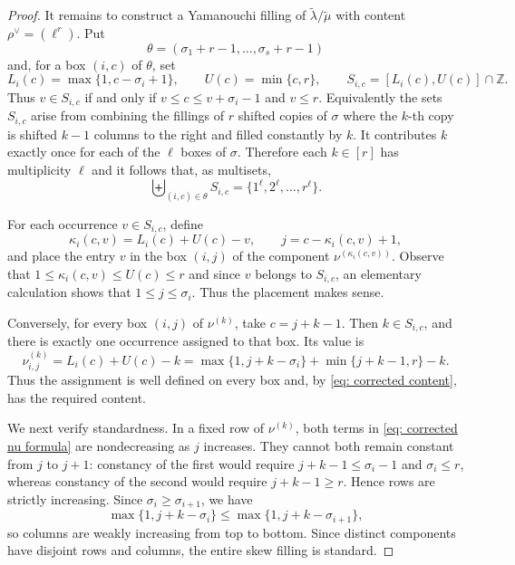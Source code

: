 \documentclass[11pt, reqno]{amsart}
\numberwithin{equation}{section}
\theoremstyle{definition}
\newcommand{\s}{\sigma}
\begin{document}
\begin{appendix}
\begin{proof}
It remains to construct a Yamanouchi filling of
$\widetilde\lambda/\widetilde\mu$ with content
$\rho^\vee=(\ell^r)$.  Put
\[
\theta=(\sigma_1+r-1,\ldots,\sigma_s+r-1)
\]
and, for a box $(i,c)$ of $\theta$, set
\begin{equation}\label{eq: corrected S sets}
L_i(c)=\max\{1,c-\sigma_i+1\},\qquad
U(c)=\min\{c,r\},\qquad
S_{i,c}=[L_i(c),U(c)]\cap\mathbb Z.
\end{equation}
Thus $v\in S_{i,c}$ if and only if
$v\leq c\leq v+\sigma_i-1$ and $v\leq r$. Equivalently the sets $S_{i,c}$ arise from combining the fillings  of $r$ shifted copies of $\s$ where the $k$-th copy is shifted $k-1$ columns to the right and filled constantly by $k$. It contributes $k$ exactly once for each of the $\ell$ boxes of $\s$. Therefore each $k\in[r]$ has multiplicity $\ell$ and it follows that, as multisets,
\begin{equation}\label{eq: corrected content}
\mathop{\biguplus}_{(i,c)\in\theta}S_{i,c}
=\{1^\ell,2^\ell,\ldots,r^\ell\}.
\end{equation}

For each occurrence $v\in S_{i,c}$, define
\begin{equation}\label{eq: corrected stage assignment}
\kappa_i(c,v)=L_i(c)+U(c)-v,
\qquad j=c-\kappa_i(c,v)+1,
\end{equation}
and place the entry $v$ in the box $(i,j)$ of the component
$\nu^{(\kappa_i(c,v))}$.  Observe that  $1\leq \kappa_i(c,v)\leq U(c)\leq r$ and since $v$ belongs to
$S_{i,c}$, an elementary calculation shows that $1\leq j\leq\sigma_i$. Thus the placement makes sense.

 Conversely, for every box
$(i,j)$ of $\nu^{(k)}$, take $c=j+k-1$.  Then $k\in S_{i,c}$, and there is
exactly one occurrence assigned to that box. Its value is
\begin{equation}\label{eq: corrected nu formula}
\nu_{i,j}^{(k)}=L_i(c)+U(c)-k=
\max\{1,j+k-\sigma_i\}+\min\{j+k-1,r\}-k.
\end{equation}
Thus the assignment is well defined on every box and, by
\eqref{eq: corrected content}, has the required content.

We next verify standardness.  In a fixed row of $\nu^{(k)}$, both terms in
\eqref{eq: corrected nu formula} are nondecreasing as $j$ increases.  They
cannot both remain constant from $j$ to $j+1$: constancy of the first would require
$j+k-1\leq\sigma_i-1$ and $\sigma_i\leq r$, whereas constancy of the second would
require $j+k-1\geq r$. Hence rows are strictly
increasing.  Since $\s_i\geq\sigma_{i+1}$, we have
\[
\max\{1,j+k-\sigma_i\}
\leq\max\{1,j+k-\sigma_{i+1}\},
\]
so columns are weakly increasing from top to bottom.  Since distinct
components have disjoint rows and columns, the entire skew filling is
standard.


\end{proof}
\end{appendix}
\end{document}
